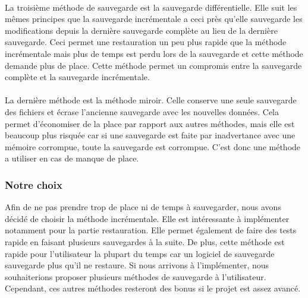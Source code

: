             \paragraph*{}
            La troisième méthode de sauvegarde est la sauvegarde différentielle. Elle suit les mêmes principes que la sauvegarde incrémentale a ceci près qu'elle sauvegarde les modifications depuis la dernière sauvegarde complète au lieu de la dernière sauvegarde. Ceci permet une restauration un peu plus rapide que la méthode incrémentale mais plus de temps est perdu lors de la sauvegarde et cette méthode demande plus de place. Cette méthode permet un compromis entre la sauvegarde complète et la sauvegarde incrémentale.
            \paragraph*{}
            La dernière méthode est la méthode miroir. Celle conserve une seule sauvegarde des fichiers et écrase l'ancienne sauvegarde avec les nouvelles données. Cela permet d'économiser de la place par rapport aux autres méthodes, mais elle est beaucoup plus risquée car si une sauvegarde est faite par inadvertance avec une mémoire corrompue, toute la sauvegarde est corrompue. C'est donc une méthode a utiliser en cas de manque de place. 
            
        \subsubsection*{Notre choix}
            Afin de ne pas prendre trop de place ni de temps à sauvegarder, nous avons décidé de choisir la méthode incrémentale. Elle est intéressante à implémenter notamment pour la partie restauration. Elle permet également de faire des tests rapide en faisant plusieurs sauvegardes à la suite. De plus, cette méthode est rapide pour l'utilisateur la plupart du temps car un logiciel de sauvegarde sauvegarde plus qu'il ne restaure. Si nous arrivons à l'implémenter, nous souhaiterions proposer plusieurs méthodes de sauvegarde à l'utilisateur. Cependant, ces autres méthodes resteront des bonus si le projet est assez avancé.
            
